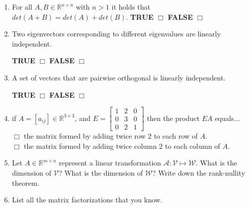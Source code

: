 \documentclass[14pt]{report}
\begin{document}
\begin{enumerate}
\item For all $A,B \in \mathbb{R}^{n \times n}$ with $n >1$ it holds that $det(A+B)=det(A)+det(B)$.
 \quad \textbf{TRUE} $\Box$ \quad\textbf{FALSE} $\Box$ 


\item Two eigenvectors corresponding to different eigenvalues  are linearly  independent.

 \quad \textbf{TRUE} $\Box$ \quad\textbf{FALSE} $\Box$ 

\item A set of vectors that are pairwise orthogonal is 
  linearly independent. 

\quad \textbf{TRUE} $\Box$ \quad\textbf{FALSE} $\Box$ 


\item if $A=[a_{ij}]\in\mathbb{R}^{3\times 3}$, and $E=\left[\begin{array}{ccc}
  1&2&0\\0&3&0\\0&2&1\end{array}\right]$ then the product $EA$ equals...\\

     $\Box$ the matrix formed by adding twice row 2 to each row of $A$.\\
     $\Box$ the matrix formed by adding twice column 2 to each column of $A$. 


\item Let $A\in\mathbb{R}^{m\times n}$ represent a linear transformation
  $\mathcal{A}:\mathcal{V}\mapsto \mathcal{W}$. What is the dimension of $\mathcal{V}$?
What is the dimension of $\mathcal{W}$? Write down the rank-nullity theorem.


\item List all the matrix factorizations that you know.





\end{enumerate}
\end{document}

